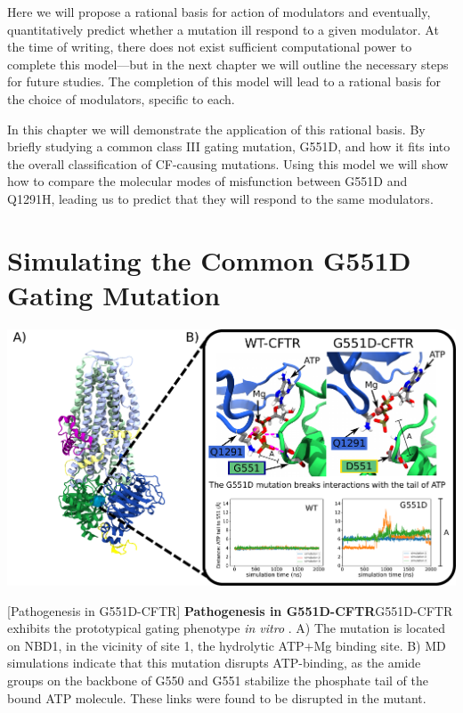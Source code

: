 Here we will propose a rational basis for action of modulators and eventually, quantitatively predict whether a mutation ill respond to a given modulator. At the time of writing, there does not exist sufficient computational power to complete this model---but in the next chapter we will outline the necessary steps for future studies. The completion of this model will lead to a rational basis for the choice of modulators, specific to each. 

In this chapter we will demonstrate the application of this rational basis. By briefly studying a common class III gating mutation, G551D, and how it fits into the overall classification of CF-causing mutations. Using this model we will show how to compare the molecular modes of misfunction between G551D and Q1291H, leading us to predict that they will respond to the same modulators. 

\section{Simulating the Common G551D Gating Mutation}

	\begin{center}
		\includegraphics[width=\textwidth]{figures/perspective/G551D.pdf}
	\end{center}

\begingroup
\captionsetup{singlelinecheck = false, justification=raggedright}
[Pathogenesis in G551D-CFTR] {\textbf{Pathogenesis in G551D-CFTR}}{G551D-CFTR exhibits the prototypical gating phenotype \textit{in vitro} \cite{bompadre2007, wang2020}. A) The mutation is located on NBD1, in the vicinity of site 1, the hydrolytic ATP+Mg binding site. B) MD simulations indicate that this mutation disrupts ATP-binding, as the amide groups on the backbone of G550 and G551 stabilize the phosphate tail of the bound ATP molecule. These links were found to be disrupted in the mutant.} 
\label{G551D_results}
\endgroup

